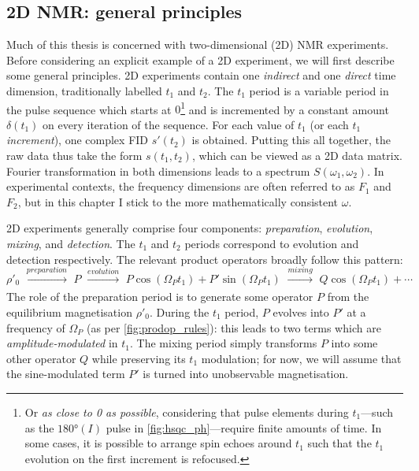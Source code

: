 \subsection{2D NMR: general principles}
\label{subsec:theory__2dnmr}

Much of this thesis is concerned with two-dimensional (2D) NMR experiments.
Before considering an explicit example of a 2D experiment, we will first describe some general principles.\autocite{Aue1976JCP_2D,Jeener2016PNMRS}
2D experiments contain one \textit{indirect} and one \textit{direct} time dimension, traditionally labelled $t_1$ and $t_2$.
The $t_1$ period is a variable period in the pulse sequence which starts at $0$\footnote{Or \textit{as close to 0 as possible}, considering that pulse elements during $t_1$---such as the $\ang{180}(I)$ pulse in \cref{fig:hsqc_ph}---require finite amounts of time. In some cases, it is possible to arrange spin echoes around $t_1$ such that the $t_1$ evolution on the first increment is refocused.} and is incremented by a constant amount $\delta(t_1)$ on every iteration of the sequence.
For each value of $t_1$ (or each $t_1$ \textit{increment}), one complex FID $s'(t_2)$ is obtained.
Putting this all together, the raw data thus take the form $s(t_1, t_2)$, which can be viewed as a 2D data matrix.
Fourier transformation in both dimensions leads to a spectrum $S(\omega_1, \omega_2)$.
In experimental contexts, the frequency dimensions are often referred to as $F_1$ and $F_2$, but in this chapter I stick to the more mathematically consistent $\omega$.

2D experiments generally comprise four components: \textit{preparation}, \textit{evolution}, \textit{mixing}, and \textit{detection}.
The $t_1$ and $t_2$ periods correspond to evolution and detection respectively.
The relevant product operators broadly follow this pattern:
\begin{equation}
    \label{eq:2d_pemd}
    \rho'_0 \,\,\xrightarrow[]{\textit{preparation}} \,\, P \,\, \xrightarrow[]{\textit{evolution}} \,\, P\cos(\Omega_P t_1) + P'\sin(\Omega_P t_1) \,\, \xrightarrow[]{\textit{mixing}} \,\, Q\cos(\Omega_P t_1) + \cdots
\end{equation}
The role of the preparation period is to generate some operator $P$ from the equilibrium magnetisation $\rho'_0$.
During the $t_1$ period, $P$ evolves into $P'$ at a frequency of $\Omega_P$ (as per \cref{fig:prodop_rules}): this leads to two terms which are \textit{amplitude-modulated} in $t_1$.
The mixing period simply transforms $P$ into some other operator $Q$ while preserving its $t_1$ modulation; for now, we will assume that the sine-modulated term $P'$ is turned into unobservable magnetisation.

